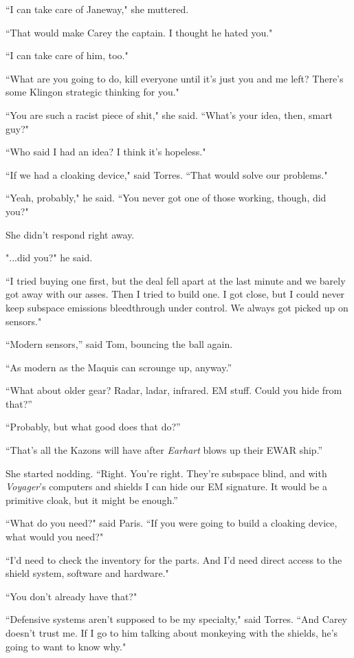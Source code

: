\documentclass[twoside,letterpaper,12pt]{memoir}
\begin{document}
``I can take care of Janeway," she muttered. 

``That would make Carey the captain. I thought he hated you." 

``I can take care of him, too." 

``What are you going to do, kill everyone until it's just you and me left? There's some Klingon strategic thinking for you." 

``You are such a racist piece of shit," she said. ``What's your idea, then, smart guy?" 

``Who said I had an idea? I think it's hopeless." 

``If we had a cloaking device," said Torres. ``That would solve our problems." 

``Yeah, probably," he said. ``You never got one of those working, though, did you?" 

She didn't respond right away. 

"...did you?" he said. 

``I tried buying one first, but the deal fell apart at the last minute and we barely got away with our asses. Then I tried to build one. I got close, but I could never keep subspace emissions bleedthrough under control. We always got picked up on sensors." 

``Modern sensors,” said Tom, bouncing the ball again. 

“As modern as the Maquis can scrounge up, anyway.” 

“What about older gear? Radar, ladar, infrared. EM stuff. Could you hide from that?” 

“Probably, but what good does that do?” 

“That’s all the Kazons will have after \textit{Earhart} blows up their EWAR ship.” 

She started nodding. “Right. You’re right. They’re subspace blind, and with \textit{Voyager}’s computers and shields I can hide our EM signature. It would be a primitive cloak, but it might be enough.” 

``What do you need?" said Paris. ``If you were going to build a cloaking device, what would you need?" 

``I'd need to check the inventory for the parts. And I'd need direct access to the shield system, software and hardware." 

``You don't already have that?" 

``Defensive systems aren't supposed to be my specialty," said Torres. ``And Carey doesn't trust me. If I go to him talking about monkeying with the shields, he's going to want to know why." 
\end{document}
